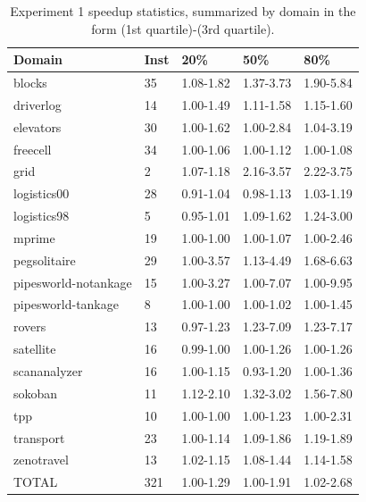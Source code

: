 \documentclass[letterpaper]{article}
\begin{document}
\begin{table}
	\begin{center}
	    \begin{tabular}{| l | l | l | l | l |}
	    \hline
	    Domain & Inst & 20\% & 50\% & 80\%
	    \\ \hline
	    blocks & 35 & 1.08-1.82 & 1.37-3.73 & 1.90-5.84
	    \\ \hline
	    driverlog & 14 & 1.00-1.49 & 1.11-1.58 & 1.15-1.60
	    \\ \hline
	    elevators & 30 & 1.00-1.62 & 1.00-2.84 & 1.04-3.19
	    \\ \hline
	    freecell & 34 & 1.00-1.06 & 1.00-1.12 & 1.00-1.08
	    \\ \hline
	    grid & 2 & 1.07-1.18 & 2.16-3.57 & 2.22-3.75
	    \\ \hline
	    logistics00 & 28 & 0.91-1.04 & 0.98-1.13 & 1.03-1.19
	    \\ \hline
	    logistics98 & 5 & 0.95-1.01 & 1.09-1.62 & 1.24-3.00
	    \\ \hline
	    mprime & 19 & 1.00-1.00 & 1.00-1.07 & 1.00-2.46
	    \\ \hline
	    pegsolitaire & 29 & 1.00-3.57 & 1.13-4.49 & 1.68-6.63
	    \\ \hline
	    pipesworld-notankage & 15 & 1.00-3.27 & 1.00-7.07 & 1.00-9.95
	    \\ \hline
	    pipesworld-tankage & 8 & 1.00-1.00 & 1.00-1.02 & 1.00-1.45
	    \\ \hline
	    rovers & 13 & 0.97-1.23 & 1.23-7.09 & 1.23-7.17
	    \\ \hline
	    satellite & 16 & 0.99-1.00 & 1.00-1.26 & 1.00-1.26
	    \\ \hline
	    scananalyzer & 16 & 1.00-1.15 & 0.93-1.20 & 1.00-1.36
	    \\ \hline
	    sokoban & 11 & 1.12-2.10 & 1.32-3.02 & 1.56-7.80
	    \\ \hline
	    tpp & 10 & 1.00-1.00 & 1.00-1.23 & 1.00-2.31
	    \\ \hline
	    transport & 23 & 1.00-1.14 & 1.09-1.86 & 1.19-1.89
	    \\ \hline
	    zenotravel & 13 & 1.02-1.15 & 1.08-1.44 & 1.14-1.58
	    \\ \hline
	    TOTAL & 321 & 1.00-1.29 & 1.00-1.91 & 1.02-2.68
	    \\ \hline
	    \end{tabular}
	\end{center}
	\caption{Experiment 1 speedup statistics, summarized by domain in the form (1st quartile)-(3rd quartile).}
	 \label{tab:percent}
\end{table}
\end{document}
